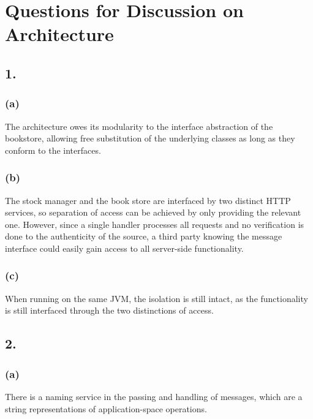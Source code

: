 \documentclass[12pt]{article}
\begin{document}
\section*{Questions for Discussion on Architecture} %

\subsection*{1.} %

\subsubsection*{(a)} %

The architecture owes its modularity to the interface abstraction of the bookstore, allowing free substitution of the underlying classes as long as they conform to the interfaces.

\subsubsection*{(b)} %

The stock manager and the book store are interfaced by two distinct HTTP services, so separation of access can be achieved by only providing the relevant one. However, since a single handler processes all requests and no verification is done to the authenticity of the source, a third party knowing the message interface could easily gain access to all server-side functionality.

\subsubsection*{(c)} %

When running on the same JVM, the isolation is still intact, as the functionality is still interfaced through the two distinctions of access.

\subsection*{2.} %

\subsubsection*{(a)} %

There is a naming service in the passing and handling of messages, which are a string representations of application-space operations.
\end{document}
